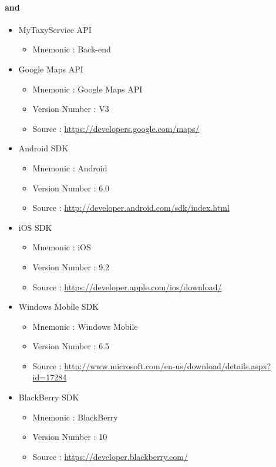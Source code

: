 \paragraph{ and } 
\begin{itemize}
	\item MyTaxyService API
	\begin{itemize}
		\item Mnemonic : Back-end
	\end{itemize}
	\item Google Maps API
	\begin{itemize}
		\item Mnemonic : Google Maps API
		\item Version Number : V3
		\item Source : \url{https://developers.google.com/maps/} 
	\end{itemize}

	\item Android SDK
	\begin{itemize}
		\item Mnemonic : Android
		\item Version Number : 6.0
		\item Source : \url{http://developer.android.com/sdk/index.html} 
	\end{itemize}

	\item iOS SDK
	\begin{itemize}
		\item Mnemonic : iOS
		\item Version Number : 9.2
		\item Source : \url{https://developer.apple.com/ios/download/} 
	\end{itemize}

	\item Windows Mobile SDK
	\begin{itemize}
		\item Mnemonic : Windows Mobile
		\item Version Number : 6.5
		\item Source : \url{http://www.microsoft.com/en-us/download/details.aspx?id=17284} 
	\end{itemize}

	\item BlackBerry SDK
	\begin{itemize}
		\item Mnemonic : BlackBerry
		\item Version Number : 10
		\item Source : \url{https://developer.blackberry.com/} 
	\end{itemize}		
\end{itemize}


